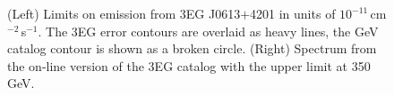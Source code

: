 \begin{figure}[t]
\caption{\label{FIG::OBSERVATIONS::J0613} (Left) Limits on 
emission from 3EG J0613$+$4201 in units of
$10^{-11}$\,cm$^{-2}$\,s$^{-1}$. The 3EG error contours are overlaid
as heavy lines, the GeV catalog contour is shown as a broken
circle. (Right) Spectrum from the on-line version of the 3EG catalog with
the upper limit at 350\,GeV.}
\end{figure}


